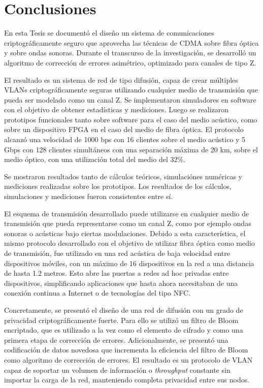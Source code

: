\chapter{Conclusiones}

En esta Tesis se documentó el diseño un sistema de comunicaciones criptográficamente seguro que aprovecha las técnicas de CDMA sobre fibra óptica y sobre ondas sonoras. Durante el transcurso de la investigación, se desarrolló un algoritmo de corrección de errores asimétrico, optimizado para canales de tipo Z.

El resultado es un sistema de red de tipo difusión, capaz de crear múltiples VLANs criptográficamente seguras utilizando cualquier medio de transmisión que pueda ser modelado como un canal Z. 
Se implementaron simuladores en software con el objetivo de obtener estadísticas y mediciones. Luego se realizaron prototipos funcionales tanto sobre software para el caso del medio acústico, como sobre un dispositivo FPGA en el caso del medio de fibra óptica. El protocolo alcanzó una velocidad de 1000 bps con 16 clientes sobre el medio acústico y 5 Gbps con 128 clientes simultáneos con una separación máxima de 20 km, sobre el medio óptico, con una utilización total del medio del 32\%.

Se mostraron resultados tanto de cálculos teóricos, simulaciónes numéricas y mediciones realizadas sobre los prototipos. Los resultados de los cálculos, simulaciones y mediciones fueron consistentes entre sí.

El esquema de transmisión desarrollado puede utilizarse en cualquier medio de transmisión que pueda representarse como un canal Z, como por ejemplo ondas sonoras o acústicas bajo ciertas modulaciones. Debido a esta característica, el mismo protocolo desarrollado con el objetivo de utilizar fibra óptica como medio de transmisión, fue utilizado en una red acústica de baja velocidad entre dispositivos móviles, con un máximo de 16 dispositivos en la red a una distancia de hasta 1.2 metros. Esto abre las puertas a redes ad hoc privadas entre dispositivos, simplificando aplicaciones que hasta ahora necesitaban de una conexión continua a Internet o de tecnologías del tipo NFC.

Concretamente, se presentó el diseño de una red de difusión con un grado de privacidad criptográficamente fuerte. Para ello se utilizó un filtro de Bloom \cite{Bloom70space/timetrade-offs} encriptado, que es utilizado a la vez como el elemento de cifrado y como una primera etapa de corrección de errores. Adicionalmente, se presentó una codificación de datos novedosa\cite{6476559} que incrementa la eficiencia del filtro de Bloom como algoritmo de corrección de errores. El resultado es un protocolo de VLAN capaz de soportar un volumen de información o \textit{throughput} constante sin importar la carga de la red, manteniendo completa privacidad entre sus nodos.

